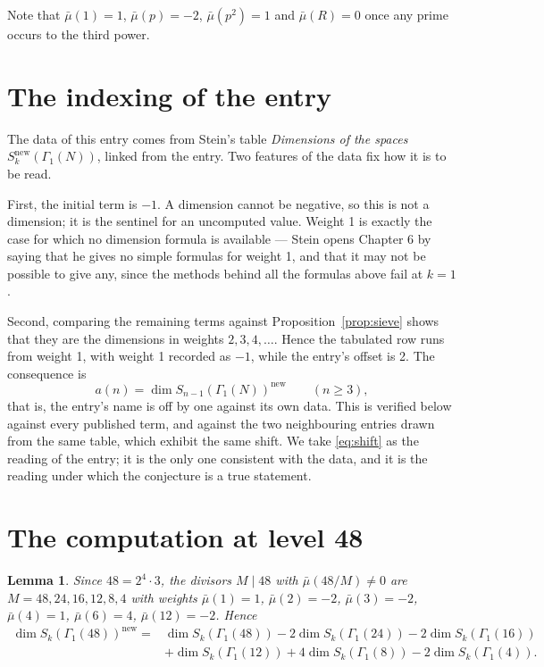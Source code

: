 \documentclass[11pt,a4paper]{article}
\theoremstyle{plain}
\newtheorem{lemma}[theorem]{Lemma}
\theoremstyle{definition}
\begin{document}
Note that $\bar\mu(1)=1$, $\bar\mu(p)=-2$, $\bar\mu(p^{2})=1$ and $\bar\mu(R)=0$ once any
prime occurs to the third power.

\section{The indexing of the entry}

The data of this entry comes from Stein's table \emph{Dimensions of the spaces
$S^{\mathrm{new}}_{k}(\Gamma_{1}(N))$}, linked from the entry. Two features of the data fix
how it is to be read.

First, the initial term is $-1$. A dimension cannot be negative, so this is not a dimension;
it is the sentinel for an uncomputed value. Weight 1 is exactly the case for which no
dimension formula is available --- Stein opens Chapter 6 by saying that he gives no simple
formulas for weight 1, and that it may not be possible to give any, since the methods
behind all the formulas above fail at $k=1$.

Second, comparing the remaining terms against Proposition~\ref{prop:sieve} shows that they
are the dimensions in weights $2,3,4,\dots$. Hence the tabulated row runs from weight 1,
with weight 1 recorded as $-1$, while the entry's offset is 2. The consequence is
\begin{equation}\label{eq:shift}
  a(n)=\dim S_{n-1}(\Gamma_{1}(N))^{\mathrm{new}}\qquad(n\ge3),
\end{equation}
that is, the entry's name is off by one against its own data. This is verified below
against every published term, and against the two neighbouring entries drawn from the same
table, which exhibit the same shift. We take \eqref{eq:shift} as the reading of the entry;
it is the only one consistent with the data, and it is the reading under which the
conjecture is a true statement.

\section{The computation at level 48}

\begin{lemma}\label{lem:sieve}
Since $48=2^{4}\cdot3$, the divisors $M\mid48$ with $\bar\mu(48/M)\ne0$ are
$M=48,24,16,12,8,4$ with weights $\bar\mu(1)=1$, $\bar\mu(2)=-2$, $\bar\mu(3)=-2$,
$\bar\mu(4)=1$, $\bar\mu(6)=4$, $\bar\mu(12)=-2$. Hence
\begin{align*}
  \dim S_{k}(\Gamma_{1}(48))^{\mathrm{new}}={}&\dim S_{k}(\Gamma_{1}(48))
  -2\dim S_{k}(\Gamma_{1}(24))-2\dim S_{k}(\Gamma_{1}(16))\\
  &+\dim S_{k}(\Gamma_{1}(12))+4\dim S_{k}(\Gamma_{1}(8))-2\dim S_{k}(\Gamma_{1}(4)).
\end{align*}
\end{lemma}
\end{document}
